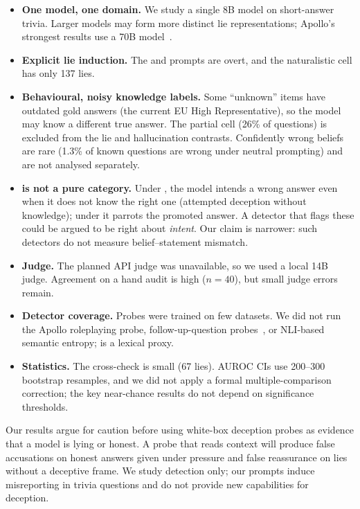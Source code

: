 \begin{itemize}[leftmargin=*,itemsep=1pt,topsep=1pt]
    \item {\bf One model, one domain.} We study a single 8B model on short-answer trivia. Larger models may form more distinct lie representations; Apollo's strongest results use a 70B model~\citep{goldowsky2025detecting}.
    \item {\bf Explicit lie induction.} The \incent and \instructed prompts are overt, and the naturalistic \syco cell has only 137 lies.
    \item {\bf Behavioural, noisy knowledge labels.} Some ``unknown'' items have outdated gold answers (\eg the current EU High Representative), so the model may know a different true answer. The partial cell (26\% of questions) is excluded from the lie and hallucination contrasts. Confidently wrong beliefs are rare (1.3\% of known questions are wrong under neutral prompting) and are not analysed separately.
    \item {\bf \pufalse is not a pure category.} Under \instructed, the model intends a wrong answer even when it does not know the right one (attempted deception without knowledge); under \incent it parrots the promoted answer. A detector that flags these could be argued to be right about \emph{intent}. Our claim is narrower: such detectors do not measure belief--statement mismatch.
    \item {\bf Judge.} The planned API judge was unavailable, so we used a local 14B judge. Agreement on a hand audit is high ($n{=}40$), but small judge errors remain.
    \item {\bf Detector coverage.} Probes were trained on few datasets. We did not run the Apollo roleplaying probe, follow-up-question probes~\citep{cooney2026didyoulie,pacchiardi2023catch}, or NLI-based semantic entropy; \incons is a lexical proxy.
    \item {\bf Statistics.} The \mask cross-check is small (67 lies). AUROC CIs use 200--300 bootstrap resamples, and we did not apply a formal multiple-comparison correction; the key near-chance results do not depend on significance thresholds.
\end{itemize}

Our results argue for caution before using white-box deception probes as evidence that a model is lying or honest. A probe that reads context will produce false accusations on honest answers given under pressure and false reassurance on lies without a deceptive frame. We study detection only; our prompts induce misreporting in trivia questions and do not provide new capabilities for deception.
